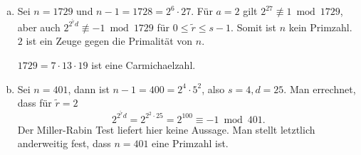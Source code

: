 
\begin{ex} \label{3.20}
	\begin{enumerate}[a)]
		\item
			Sei $n = 1729$ und $n - 1 = 1728 = 2^6 \cdot 27$.
			Für $a = 2$ gilt $2^{27} \not\equiv 1 \bmod 1729$, aber auch $2^{2^{\tilde r} d} \not\equiv -1 \bmod 1729$ für $0 \le \tilde r \le s-1$.
			Somit ist $n$ kein Primzahl.
			$2$ ist ein Zeuge gegen die Primalität von $n$.

			$1729 = 7 \cdot 13 \cdot 19$ ist eine Carmichaelzahl.
		\item
			Sei $n = 401$, dann ist $n - 1 = 400 = 2^4 \cdot 5^2$, also $s = 4, d = 25$.
			Man errechnet, dass für $\tilde r = 2$
			\[
				2^{2^{\tilde r} d} = 2^{2^2 \cdot 25} = 2^{100} \equiv -1 \bmod 401.
			\]
			Der Miller-Rabin Test liefert hier keine Aussage.
			Man stellt letztlich anderweitig fest, dass $n = 401$ eine Primzahl ist.
	\end{enumerate}
\end{ex}

